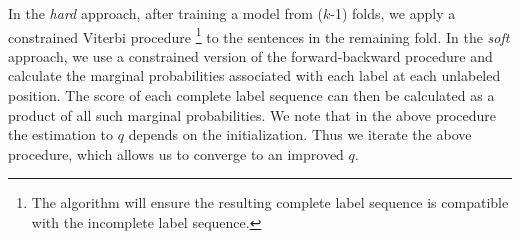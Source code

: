 In the {\em hard} approach, after training a model from ($k$-1) folds, we apply a constrained Viterbi procedure \footnote{The algorithm will ensure the resulting complete label sequence is compatible with the incomplete label sequence.} to the sentences in the remaining fold.
In the {\em soft} approach, we use a constrained version of the forward-backward procedure and calculate the marginal probabilities associated with each label at each unlabeled position.
The score of each complete label sequence can then be calculated as a product of all such marginal probabilities.
We note that in the above procedure the estimation to $q$ depends on the initialization. 
Thus we iterate the above procedure, which allows us to converge to an improved $q$. 




